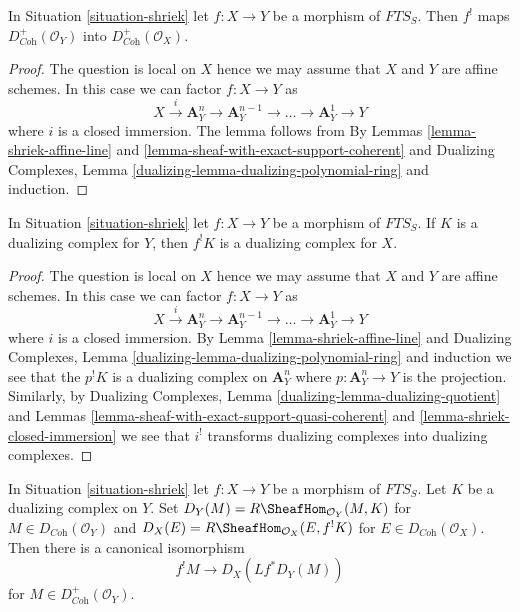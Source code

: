 \begin{lemma}
\label{lemma-shriek-coherent}
In Situation \ref{situation-shriek} let $f : X \to Y$ be a morphism of
$\textit{FTS}_S$. Then $f^!$ maps
$D_{\textit{Coh}}^+(\mathcal{O}_Y)$ into $D_{\textit{Coh}}^+(\mathcal{O}_X)$.
\end{lemma}

\begin{proof}
The question is local on $X$ hence we may assume that $X$ and $Y$ are
affine schemes. In this case we can factor $f : X \to Y$ as
$$
X \xrightarrow{i} \mathbf{A}^n_Y \to \mathbf{A}^{n - 1}_Y \to \ldots \to
\mathbf{A}^1_Y \to Y
$$
where $i$ is a closed immersion. The lemma follows from
By Lemmas \ref{lemma-shriek-affine-line} and
\ref{lemma-sheaf-with-exact-support-coherent} and
Dualizing Complexes, Lemma
\ref{dualizing-lemma-dualizing-polynomial-ring}
and induction.
\end{proof}

\begin{lemma}
\label{lemma-shriek-dualizing}
In Situation \ref{situation-shriek} let $f : X \to Y$ be a morphism of
$\textit{FTS}_S$. If $K$ is a dualizing complex
for $Y$, then $f^!K$ is a dualizing complex for $X$.
\end{lemma}

\begin{proof}
The question is local on $X$ hence we may assume that $X$ and $Y$ are
affine schemes. In this case we can factor $f : X \to Y$ as
$$
X \xrightarrow{i} \mathbf{A}^n_Y \to \mathbf{A}^{n - 1}_Y \to \ldots \to
\mathbf{A}^1_Y \to Y
$$
where $i$ is a closed immersion. By Lemma \ref{lemma-shriek-affine-line} and
Dualizing Complexes, Lemma \ref{dualizing-lemma-dualizing-polynomial-ring}
and induction we see that
the $p^!K$ is a dualizing complex on $\mathbf{A}^n_Y$ where
$p : \mathbf{A}^n_Y \to Y$ is the projection. Similarly, by
Dualizing Complexes, Lemma \ref{dualizing-lemma-dualizing-quotient}
and Lemmas
\ref{lemma-sheaf-with-exact-support-quasi-coherent} and
\ref{lemma-shriek-closed-immersion} we see that $i^!$
transforms dualizing complexes into dualizing complexes.
\end{proof}

\begin{lemma}
\label{lemma-shriek-via-duality}
In Situation \ref{situation-shriek} let $f : X \to Y$ be a morphism of
$\textit{FTS}_S$. Let $K$ be a dualizing complex
on $Y$. Set $D_Y(M) = R\SheafHom_{\mathcal{O}_Y}(M, K)$ for
$M \in D_{\textit{Coh}}(\mathcal{O}_Y)$ and
$D_X(E) = R\SheafHom_{\mathcal{O}_X}(E, f^!K)$ for
$E \in D_{\textit{Coh}}(\mathcal{O}_X)$. Then there is a canonical
isomorphism
$$
f^!M \longrightarrow D_X(Lf^*D_Y(M))
$$
for $M \in D_{\textit{Coh}}^+(\mathcal{O}_Y)$.
\end{lemma}

